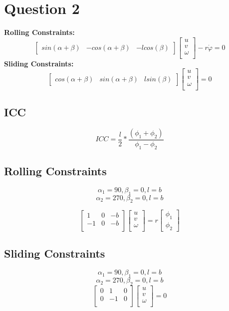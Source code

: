 \section{Question 2}
\bf{Rolling Constraints:}
$$
\begin{bmatrix} 
sin(\alpha + \beta) & -cos(\alpha + \beta) & -lcos(\beta)
\end{bmatrix}
\begin{bmatrix} 
u \\
v \\
\omega \\
\end{bmatrix} 
-
r \dot{\varphi}
= 0
$$
\bf{Sliding Constraints:}
$$
\begin{bmatrix} 
cos(\alpha + \beta) & sin(\alpha + \beta) & lsin(\beta)
\end{bmatrix}
\begin{bmatrix} 
u \\
v \\
\omega \\
\end{bmatrix} 
= 0
$$

\subsection{ICC}
$$
ICC = \dfrac{l}{2}* \dfrac{(\phi_1 + \phi_2)}{\phi_1 - \phi_2}
$$

\subsection{Rolling Constraints}
$$
\alpha_1 =  90, 
\beta_1 = 0,
l = b
$$
$$
\alpha_2 =  270, 
\beta_2 = 0,
l = b
$$

$$
\begin{bmatrix} 
1 & 0 & -b\\
-1 & 0 & -b\\
\end{bmatrix} 
\begin{bmatrix} 
u \\
v \\
\omega \\
\end{bmatrix} 
= r 
 \begin{bmatrix} 
\phi_1 \\
\phi_2
\end{bmatrix}
$$

\subsection{Sliding Constraints}
$$
\alpha_1 =  90, 
\beta_1 = 0,
l = b
$$
$$
\alpha_2 =  270, 
\beta_2 = 0,
l = b
$$
$$
\begin{bmatrix} 
0 & 1 & 0\\
0 & -1 & 0\\
\end{bmatrix} 
\begin{bmatrix} 
u \\
v \\
\omega \\
\end{bmatrix} 
= 
0
$$

